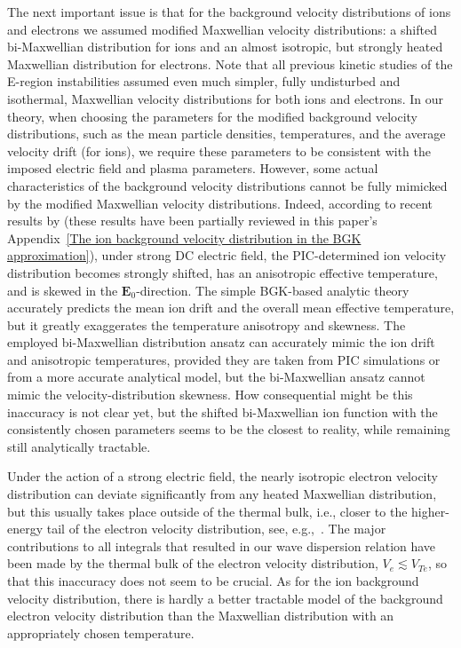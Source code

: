 \documentclass[draft]{agujournal2019}
\renewcommand{\vec}{\mathbf}
\begin{document}
{The next important issue is that for the background velocity distributions of
ions and electrons we assumed modified Maxwellian velocity distributions: a
shifted bi-Maxwellian distribution for ions and an almost isotropic, but strongly heated
Maxwellian distribution for electrons. Note that all previous kinetic studies of the E-region instabilities assumed even
much simpler, fully undisturbed and isothermal, Maxwellian velocity distributions for both
ions and electrons. In our theory, when choosing the parameters for the modified background
velocity distributions, such as the mean particle densities, temperatures, and
the average velocity drift (for ions), we require these parameters to be
consistent with the imposed electric field and plasma parameters. However, some actual
characteristics of the background velocity distributions cannot be fully
mimicked by the modified Maxwellian velocity distributions. Indeed, according
to recent results by  (these results
have been partially reviewed in this paper's Appendix~\ref{The ion background velocity distribution in the BGK approximation}), 
under strong DC electric field, the PIC-determined ion velocity distribution becomes strongly shifted, has an
anisotropic effective temperature, and is skewed in the $\vec{E}_{0}$-direction. The simple BGK-based analytic theory accurately predicts the mean
ion drift and the overall mean effective temperature, but it greatly
exaggerates the temperature anisotropy and skewness. The employed
bi-Maxwellian distribution ansatz can accurately mimic the ion drift and
anisotropic temperatures, provided they are taken from PIC simulations or from a
more accurate analytical model, but the bi-Maxwellian ansatz cannot mimic the
velocity-distribution skewness. How consequential might be this inaccuracy is
not clear yet, but the shifted bi-Maxwellian ion function with the 
consistently chosen parameters seems to be the closest to reality, while remaining still analytically tractable.

Under the action of a strong electric field, the nearly isotropic electron
velocity distribution can deviate significantly from any heated Maxwellian
distribution, but this usually takes place outside of the thermal bulk, i.e.,
closer to the higher-energy tail of the electron velocity distribution, see,
e.g.,~. The major contributions to
all integrals that resulted in our wave dispersion relation have been made by
the thermal bulk of the electron velocity distribution, $V_{e}\lesssim V_{Te}%
$, so that this inaccuracy does not seem to be crucial. As for the ion
background velocity distribution, there is hardly a better tractable model of the
background electron velocity distribution than the Maxwellian distribution 
with an appropriately chosen temperature.

}
\end{document}
